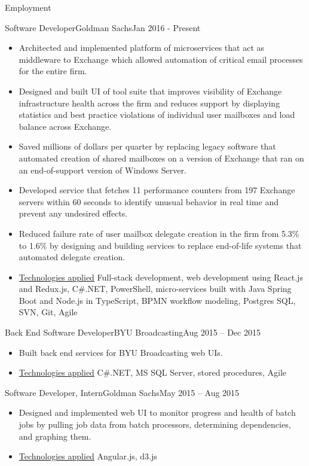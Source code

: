 \documentclass[]{lastcv}
\begin{document}
	\begin{cvsection}{Employment}
		\begin{cvsubsection}{Software Developer}{Goldman Sachs}{Jan 2016 - Present}
			\begin{itemize}
			    \item Architected and implemented platform of microservices that act as middleware to Exchange which allowed automation of critical email processes for the entire firm.
			    \item Designed and built UI of tool suite that improves visibility of Exchange infrastructure health across the firm and reduces support by displaying statistics and best practice violations of individual user mailboxes and load balance across Exchange.
			    \item Saved millions of dollars per quarter by replacing legacy software that automated creation of shared mailboxes on a version of Exchange that ran on an end-of-support version of Windows Server.
				\item Developed service that fetches 11 performance counters from 197 Exchange servers within 60 seconds to identify unusual behavior in real time and prevent any undesired effects.
				\item Reduced failure rate of user mailbox delegate creation in the firm from 5.3\% to 1.6\% by designing and building services to replace end-of-life systems that automated delegate creation.
				\item \underline{Technologies applied} Full-stack development, web development using React.js and Redux.js, C\#.NET, PowerShell, micro-services built with Java Spring Boot and Node.js in TypeScript, BPMN workflow modeling, Postgres SQL, SVN, Git, Agile
			\end{itemize}
		\end{cvsubsection}
		
		\begin{cvsubsection}{Back End Software Developer}{BYU Broadcasting}{Aug 2015 -- Dec 2015}	
			\begin{itemize}
				\item Built back end services for BYU Broadcasting web UIs.
				\item \underline{Technologies applied} C\#.NET, MS SQL Server, stored procedures, Agile
			\end{itemize}
		\end{cvsubsection}
		
		\begin{cvsubsection}{Software Developer, Intern}{Goldman Sachs}{May 2015 -- Aug 2015}		
			\begin{itemize}
				\item Designed and implemented web UI to monitor progress and health of batch jobs by pulling job data from batch processors, determining dependencies, and graphing them.
				\item \underline{Technologies applied} Angular.js, d3.js
			\end{itemize}
		\end{cvsubsection}
		

\end{cvsection}
\end{document}
